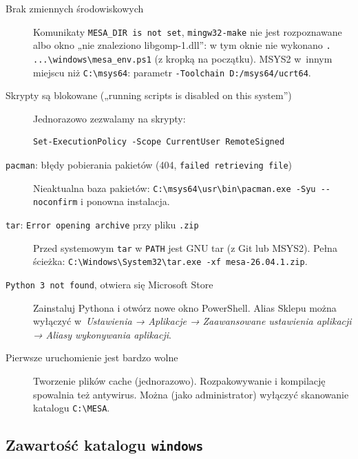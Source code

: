 \documentclass[11pt,a4paper]{article}
\begin{document}
\begin{description}
\item[Brak zmiennych środowiskowych] Komunikaty \texttt{MESA\_DIR is not set},
  \texttt{mingw32-make} nie jest rozpoznawane albo okno „nie znaleziono libgomp-1.dll”: w tym oknie
  nie wykonano \verb!. ...\windows\mesa_env.ps1!
  (z kropką na początku). MSYS2 w~innym miejscu niż \verb!C:\msys64!: parametr
  \verb!-Toolchain D:/msys64/ucrt64!.
\item[Skrypty są blokowane („running scripts is disabled on this system”)]
  Jednorazowo zezwalamy na skrypty:
\begin{verbatim}
Set-ExecutionPolicy -Scope CurrentUser RemoteSigned
\end{verbatim}
\item[\texttt{pacman}: błędy pobierania pakietów (404, \texttt{failed retrieving file})]
  Nieaktualna baza pakietów: \verb!C:\msys64\usr\bin\pacman.exe -Syu --noconfirm! i ponowna
  instalacja.
\item[\texttt{tar}: \texttt{Error opening archive} przy pliku \texttt{.zip}]
  Przed systemowym \texttt{tar} w \texttt{PATH} jest GNU tar (z Git lub MSYS2). Pełna ścieżka:
  \verb!C:\Windows\System32\tar.exe -xf mesa-26.04.1.zip!.
\item[\texttt{Python 3 not found}, otwiera się Microsoft Store]
  Zainstaluj Pythona i otwórz nowe okno PowerShell. Alias Sklepu można wyłączyć w~\emph{Ustawienia
  → Aplikacje → Zaawansowane ustawienia aplikacji → Aliasy wykonywania aplikacji}.
\item[Pierwsze uruchomienie jest bardzo wolne]
  Tworzenie plików cache (jednorazowo). Rozpakowywanie i kompilację spowalnia też antywirus.
  Można (jako administrator) wyłączyć skanowanie katalogu \verb!C:\MESA!.
\end{description}

\subsection{Zawartość katalogu \texttt{windows}}
\end{document}
